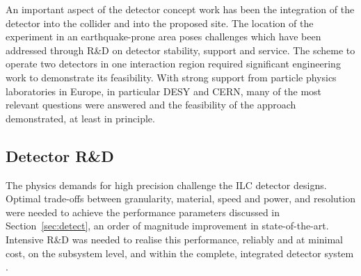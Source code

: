 \documentclass[%
 reprint,
 floatfix,
 amsmath,amssymb,
 aps,
]{revtex4-1}
\newcommand{\todo}[1]{\textcolor{red}{{#1}}}
\begin{document}
An important aspect of the detector concept work has been
the integration of the detector into the collider and into the
proposed site. The location of the experiment in an earthquake-prone
area poses challenges which have been addressed through R\&D on
detector stability, support and service. The scheme to operate two
detectors in one interaction region required
significant engineering work to demonstrate its
feasibility. With strong support from particle physics laboratories in
Europe, in  particular DESY and CERN, many of the most relevant
questions were answered and the feasibility
 of the approach demonstrated, at least in principle. 


\vspace{-.4cm}


\subsection{\label{sec:detectrd} Detector R\&D}

\vspace{-.3cm}



The physics demands for high precision challenge
the ILC detector designs.  Optimal 
trade-offs between
granularity, material, speed and power, and 
resolution were needed to achieve
the performance parameters  discussed
in Section~\ref{sec:detect},
an order of magnitude
improvement in state-of-the-art.
Intensive R\&D was needed to realise this performance,
reliably and at minimal cost,
on the subsystem level, and  within the complete,
integrated detector system \cite{RDliaision}.
\end{document}
